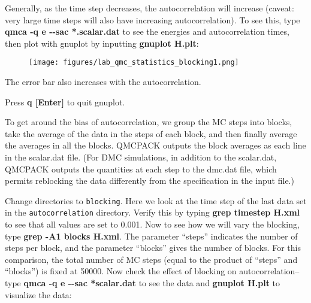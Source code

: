 Generally, as the time step decreases, the autocorrelation will increase
(caveat: very large time steps will also have increasing autocorrelation). To
see this, type \textbf{qmca -q e {-}{-}sac *.scalar.dat} to see the energies
and autocorrelation times, then plot with gnuplot by inputting \textbf{gnuplot
H.plt}:

\FloatBarrier
\begin{figure}[ht!]
\begin{center}
\texttt{[image: figures/lab\_qmc\_statistics\_blocking1.png]}
\end{center}
\end{figure}
\FloatBarrier


The error bar also increases with the autocorrelation.  

Press \textbf{q [Enter]} to quit gnuplot.

To get around the bias of autocorrelation, we group the MC steps into blocks,
take the average of the data in the steps of each block, and then finally
average the averages in all the blocks.  QMCPACK outputs the block averages as
each line in the scalar.dat file.  (For DMC simulations, in addition to the
scalar.dat, QMCPACK outputs the quantities at each step to the dmc.dat file,
which permits reblocking the data differently from the specification in the
input file.) 

Change directories to \texttt{blocking}.  Here we look at the time step of the
last data set in the \texttt{autocorrelation} directory.  Verify this by typing
\textbf{grep timestep H.xml} to see that all values are set to 0.001.  Now to
see how we will vary the blocking, type \textbf{grep -A1 blocks H.xml}.  The
parameter ``steps'' indicates the number of steps per block, and the parameter
``blocks'' gives the number of blocks.  For this comparison, the total number
of MC steps (equal to the product of ``steps'' and ``blocks'') is fixed at
50000.  Now check the effect of blocking on autocorrelation--type \textbf{qmca
-q e {-}{-}sac *scalar.dat} to see the data and \textbf{gnuplot H.plt} to
visualize the data:


